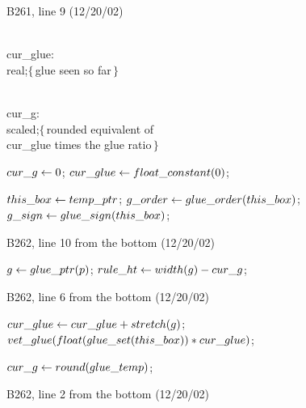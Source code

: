 {{\bugonpage B261, line 9 (12/20/02)

\ninepoint\noindent
\qquad\\{cur\_glue}: \\{real};\quad$\{\,$glue seen so far$\,\}$\par\noindent
\qquad\\{cur\_g}: \\{scaled};\quad$\{\,$rounded
  equivalent of \\{cur\_glue} times the glue ratio$\,\}$\par\noindent
{} $\\{cur\_g}\gets0$;
  $\\{cur\_glue}\gets\\{float\_constant}(0)$;\par\noindent
\quad$\\{this\_box}\gets\\{temp\_ptr}$;
 $\\{g\_order}\gets\\{glue\_order}(\\{this\_box})$;
 $\\{g\_sign}\gets\\{glue\_sign}(\\{this\_box})$;

\bugonpage B262, line 10 from the bottom (12/20/02)

\ninepoint\noindent
{} $g\gets\\{glue\_ptr}(p)$;
  $\\{rule\_ht}\gets\\{width}(g)-\\{cur\_g}$;

\bugonpage B262, line 6 from the bottom (12/20/02)

\ninepoint\noindent
\qquad{} $\\{cur\_glue}\gets\\{cur\_glue}+\\{stretch}(g)$;
 $\\{vet\_glue}(\\{float}(\\{glue\_set}(\\{this\_box}))*\\{cur\_glue})$;\par
\noindent\qquad\qquad$\\{cur\_g}\gets\\{round}(\\{glue\_temp})$;

\bugonpage B262, line 2 from the bottom (12/20/02)

}}
